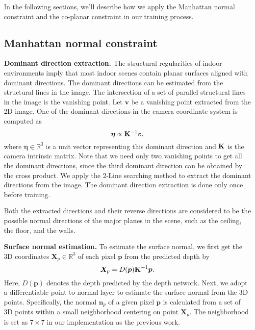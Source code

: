 \documentclass[10pt,twocolumn,letterpaper]{article}
\newcommand{\bv}[1]{{\bm {#1}}}
\newcommand{\ba}[1]{{\bf {#1}}}
\newcommand{\beq}{\begin{equation}}
\newcommand{\eeq}{\end{equation}}
\begin{document}
In the following sections, we'll describe how we apply the Manhattan normal constraint and the co-planar constraint in our training process.

\subsection{Manhattan normal constraint}

\textbf{Dominant direction extraction.}
The structural regularities of indoor environments imply that most indoor scenes contain planar surfaces aligned with dominant directions. The dominant directions can be estimated from the structural lines in the image. The intersection of a set of parallel structural lines in the image is the vanishing point. Let $\bv{v}$ be a vanishing point extracted from the 2D image. One of the dominant directions in the camera coordinate system is computed as
\beq
\bv{\eta} \propto \ba{K}^{-1}\bv{v},
\eeq 
where $\bv{\eta} \in \mathbb{R}^3$ is a unit vector representing this dominant direction and $\ba{K}$ is the camera intrinsic matrix. Note that we need only two vanishing points to get all the dominant directions, since the third dominant direction can be obtained by the cross product. We apply the 2-Line searching method \cite{lu20172} to extract the dominant directions from the image. The dominant direction extraction is done only once before training.

Both the extracted directions and their reverse directions are considered to be the possible normal directions of the major planes in the scene, such as the ceiling, the floor, and the walls.


\textbf{Surface normal estimation.}
To estimate the surface normal, we first get the 3D coordinates $\bv{X}_p \in \mathbb{R}^{3}$ of each pixel $\bv{p}$ from the predicted depth by
\beq
\bv{X}_p = D(\bv{p}) \ba{K}^{-1} \bv{p}.
\eeq
Here, $D(\bv{p})$ denotes the depth predicted by the depth network. Next, we adopt a differentiable point-to-normal layer\cite{yang2018lego,yang2018unsupervised,kaneko2019tridepth} to estimate the surface normal from the 3D points.
Specifically, the normal ${\bv{n}}_{p}$ of a given pixel $\bv{p}$ is calculated from a set of 3D points within a small neighborhood centering on point $\bv{X}_p$.  The neighborhood is set as $7 \times 7$ in our implementation as the previous work\cite{yang2018lego}.
\end{document}
